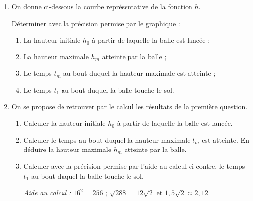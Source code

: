 \documentclass[a4paper,12pt]{article}
\begin{document}
\begin{enumerate}
\item On donne ci-dessous la courbe représentative de la fonction $h$.

\begin{center}
\end{center}

Déterminer avec la précision permise par le graphique :
\begin{enumerate}
\item[a)] La hauteur initiale $h_0$ à partir de laquelle la balle est lancée ;
\item[b)] La hauteur maximale $h_m$ atteinte par la balle ;
\item[c)] Le temps $t_m$ au bout duquel la hauteur maximale est atteinte ;
\item[d)] Le temps $t_1$ au bout duquel la balle touche le sol.
\end{enumerate}

\item On se propose de retrouver par le calcul les résultats de la première question.
\begin{enumerate}
\item[a)] Calculer la hauteur initiale $h_0$ à partir de laquelle la balle est lancée.
\item[b)] Calculer le temps au bout duquel la hauteur maximale $t_m$ est atteinte. En déduire la hauteur maximale $h_m$ atteinte par la balle.
\item[c)] Calculer avec la précision permise par l'aide au calcul ci-contre, le temps $t_1$ au bout duquel la balle touche le sol.

\textit{Aide au calcul :} $16^2 = 256$ ; $\sqrt{288} = 12\sqrt{2}$ et $1,5\sqrt{2} \approx 2,12$
\end{enumerate}
\end{enumerate}
\end{document}
